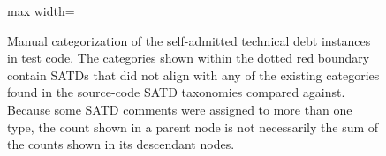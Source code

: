 \begin{figure}[!ht]
\begin{adjustbox}{max width=\textwidth}
\end{adjustbox}
\caption{Manual categorization of the \totalSatdCount{} self-admitted technical debt instances in test code. The categories shown within the dotted red boundary contain SATDs that did not align with any of the existing categories found in the source-code SATD taxonomies compared against. Because some SATD comments were assigned to more than one type, the count shown in a parent node is not necessarily the sum of the counts shown in its descendant nodes.}
\label{fig:satd-hierarchy}
\end{figure}
